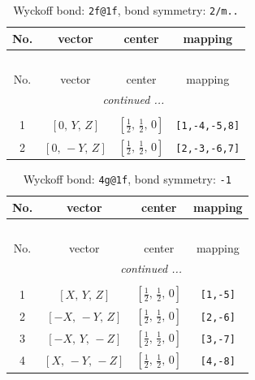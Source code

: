 \documentclass[fleqn,8pt]{jsarticle}
\begin{document}
\begin{longtable}{cccc}
\caption{Wyckoff bond: {\tt 2f@1f}, bond symmetry: {\tt 2/m..}}
 \\
 \hline \hline
No. & vector & center & mapping \\ \hline \endfirsthead

\multicolumn{3}{l}{\tablename\ \thetable{}} \\
 \hline \hline
No. & vector & center & mapping \\ \hline \endhead

 \hline \hline
\multicolumn{3}{r}{\footnotesize\it continued ...} \\ \endfoot

 \hline \hline
\multicolumn{3}{r}{} \\ \endlastfoot

1 & $\left[ 0,\, Y,\, Z \right]$ & $\left[ \frac{1}{2},\, \frac{1}{2},\, 0 \right]$ & {\tt [1,-4,-5,8]} \\ \hline
2 & $\left[ 0,\, - Y,\, Z \right]$ & $\left[ \frac{1}{2},\, \frac{1}{2},\, 0 \right]$ & {\tt [2,-3,-6,7]} \\
\end{longtable}
\renewcommand{\arraystretch}{1.2}
\begin{longtable}{cccc}
\caption{Wyckoff bond: {\tt 4g@1f}, bond symmetry: {\tt -1}}
 \\
 \hline \hline
No. & vector & center & mapping \\ \hline \endfirsthead

\multicolumn{3}{l}{\tablename\ \thetable{}} \\
 \hline \hline
No. & vector & center & mapping \\ \hline \endhead

 \hline \hline
\multicolumn{3}{r}{\footnotesize\it continued ...} \\ \endfoot

 \hline \hline
\multicolumn{3}{r}{} \\ \endlastfoot

1 & $\left[ X,\, Y,\, Z \right]$ & $\left[ \frac{1}{2},\, \frac{1}{2},\, 0 \right]$ & {\tt [1,-5]} \\ \hline
2 & $\left[ - X,\, - Y,\, Z \right]$ & $\left[ \frac{1}{2},\, \frac{1}{2},\, 0 \right]$ & {\tt [2,-6]} \\ \hline
3 & $\left[ - X,\, Y,\, - Z \right]$ & $\left[ \frac{1}{2},\, \frac{1}{2},\, 0 \right]$ & {\tt [3,-7]} \\ \hline
4 & $\left[ X,\, - Y,\, - Z \right]$ & $\left[ \frac{1}{2},\, \frac{1}{2},\, 0 \right]$ & {\tt [4,-8]} \\
\end{longtable}
\end{document}
